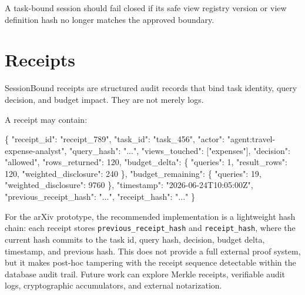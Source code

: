 \documentclass[
]{article}
\newenvironment{Shaded}{}{}
\newcommand{\DataTypeTok}[1]{\textcolor[rgb]{0.56,0.13,0.00}{#1}}
\newcommand{\DecValTok}[1]{\textcolor[rgb]{0.25,0.63,0.44}{#1}}
\newcommand{\FunctionTok}[1]{\textcolor[rgb]{0.02,0.16,0.49}{#1}}
\newcommand{\OtherTok}[1]{\textcolor[rgb]{0.00,0.44,0.13}{#1}}
\newcommand{\StringTok}[1]{\textcolor[rgb]{0.25,0.44,0.63}{#1}}
\begin{document}
A task-bound session should fail closed if its safe view registry
version or view definition hash no longer matches the approved boundary.


\hypertarget{receipts}{%
\section{Receipts}\label{receipts}}

SessionBound receipts are structured audit records that bind task
identity, query decision, and budget impact. They are not merely logs.

A receipt may contain:

\begin{Shaded}
\begin{Highlighting}[]
\FunctionTok{\{}
  \DataTypeTok{"receipt\_id"}\FunctionTok{:} \StringTok{"receipt\_789"}\FunctionTok{,}
  \DataTypeTok{"task\_id"}\FunctionTok{:} \StringTok{"task\_456"}\FunctionTok{,}
  \DataTypeTok{"actor"}\FunctionTok{:} \StringTok{"agent:travel{-}expense{-}analyst"}\FunctionTok{,}
  \DataTypeTok{"query\_hash"}\FunctionTok{:} \StringTok{"..."}\FunctionTok{,}
  \DataTypeTok{"views\_touched"}\FunctionTok{:} \OtherTok{[}\StringTok{"expenses"}\OtherTok{]}\FunctionTok{,}
  \DataTypeTok{"decision"}\FunctionTok{:} \StringTok{"allowed"}\FunctionTok{,}
  \DataTypeTok{"rows\_returned"}\FunctionTok{:} \DecValTok{120}\FunctionTok{,}
  \DataTypeTok{"budget\_delta"}\FunctionTok{:} \FunctionTok{\{}
    \DataTypeTok{"queries"}\FunctionTok{:} \DecValTok{1}\FunctionTok{,}
    \DataTypeTok{"result\_rows"}\FunctionTok{:} \DecValTok{120}\FunctionTok{,}
    \DataTypeTok{"weighted\_disclosure"}\FunctionTok{:} \DecValTok{240}
  \FunctionTok{\},}
  \DataTypeTok{"budget\_remaining"}\FunctionTok{:} \FunctionTok{\{}
    \DataTypeTok{"queries"}\FunctionTok{:} \DecValTok{19}\FunctionTok{,}
    \DataTypeTok{"weighted\_disclosure"}\FunctionTok{:} \DecValTok{9760}
  \FunctionTok{\},}
  \DataTypeTok{"timestamp"}\FunctionTok{:} \StringTok{"2026{-}06{-}24T10:05:00Z"}\FunctionTok{,}
  \DataTypeTok{"previous\_receipt\_hash"}\FunctionTok{:} \StringTok{"..."}\FunctionTok{,}
  \DataTypeTok{"receipt\_hash"}\FunctionTok{:} \StringTok{"..."}
\FunctionTok{\}}
\end{Highlighting}
\end{Shaded}

For the arXiv prototype, the recommended implementation is a lightweight
hash chain: each receipt stores \texttt{previous\_receipt\_hash} and
\texttt{receipt\_hash}, where the current hash commits to the task id,
query hash, decision, budget delta, timestamp, and previous hash. This
does not provide a full external proof system, but it makes post-hoc
tampering with the receipt sequence detectable within the database audit
trail. Future work can explore Merkle receipts, verifiable audit logs,
cryptographic accumulators, and external notarization.
\end{document}
